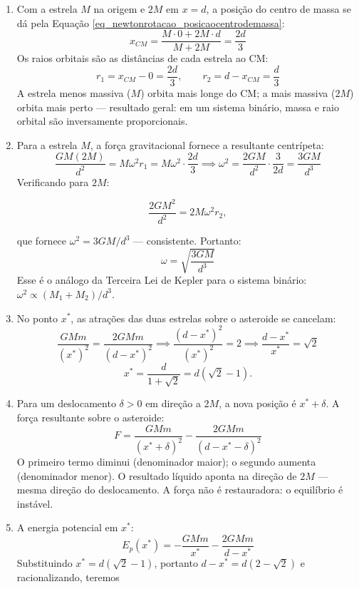 \begin{exemplo}
\begin{enumerate}

  \item[a)] Com a estrela $M$ na origem e $2M$ em $x = d$, a posição do centro de massa se dá pela Equação \eqref{eq_newtonrotacao_posicaocentrodemassa}:
  \[
    x_{CM} = \frac{M \cdot 0 + 2M \cdot d}{M + 2M} = \frac{2d}{3}
  \]
  Os raios orbitais são as distâncias de cada estrela ao CM:
  \[
    r_1 = x_{CM} - 0 = \frac{2d}{3},
    \qquad
    r_2 = d - x_{CM} = \frac{d}{3}
  \]
  A estrela menos massiva ($M$) orbita mais longe do CM; a mais
  massiva ($2M$) orbita mais perto --- resultado geral: em um sistema
  binário, massa e raio orbital são inversamente proporcionais.

  \item[b)] Para a estrela $M$, a força gravitacional fornece a resultante
  centrípeta:
  \[
    \frac{GM(2M)}{d^2} = M\omega^2 r_1 = M\omega^2 \cdot \frac{2d}{3}
    \implies
    \omega^2 = \frac{2GM}{d^2} \cdot \frac{3}{2d} = \frac{3GM}{d^3}
  \]
  Verificando para $2M$: 
  
  $$ \dfrac{2GM^2}{d^2} = 2M\omega^2 r_2 ,$$
  
  que fornece $\omega^2 = 3GM/d^3$ --- consistente. Portanto:
  \[
    \boxed{\omega = \sqrt{\frac{3GM}{d^3}}}
  \]
  Esse é o análogo da Terceira Lei de Kepler para o sistema binário:
  $\omega^2 \propto (M_1 + M_2)/d^3$.

  \item[c)] No ponto $x^*$, as atrações das duas estrelas sobre o
  asteroide se cancelam:
  \[
    \frac{GMm}{(x^*)^2} = \frac{2GMm}{(d - x^*)^2}
    \implies
    \frac{(d-x^*)^2}{(x^*)^2} = 2
    \implies
    \frac{d - x^*}{x^*} = \sqrt{2}
  \]
  \[
    \boxed{x^* = \frac{d}{1+\sqrt{2}} = d\!\left(\sqrt{2}-1\right).}
  \]

  \item[d)] Para um deslocamento $\delta > 0$ em direção a $2M$,
  a nova posição é $x^* + \delta$. A força resultante sobre o
  asteroide:
  \[
    F = \frac{GMm}{(x^*+\delta)^2} - \frac{2GMm}{(d-x^*-\delta)^2}
  \]
  O primeiro termo diminui (denominador maior); o segundo aumenta
  (denominador menor). O resultado líquido aponta na direção de
  $2M$ --- mesma direção do deslocamento. A força não é restauradora:
  o equilíbrio é instável.

  \item[e)] A energia potencial em $x^*$:
  \[
    E_p(x^*) = -\frac{GMm}{x^*} - \frac{2GMm}{d - x^*}
  \]
  Substituindo $x^* = d(\sqrt{2}-1)$, portanto
  $d - x^* = d(2 - \sqrt{2})$ e racionalizando, teremos


\end{enumerate}
\end{exemplo}
